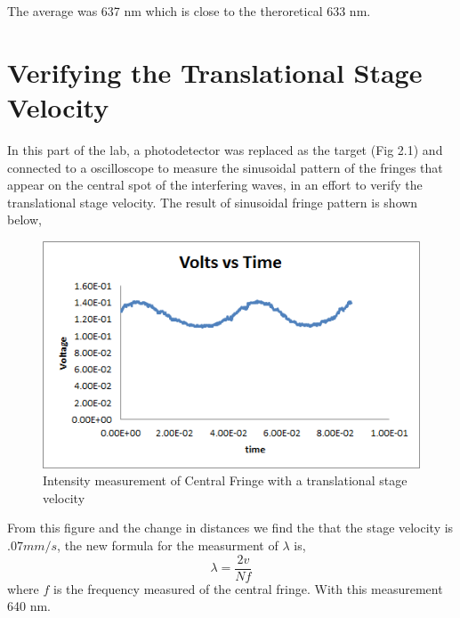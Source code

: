\documentclass[paper=a4, fontsize=11pt]{scrartcl} %
\numberwithin{equation}{section} %
\numberwithin{figure}{section} %
\numberwithin{table}{section} %
\begin{document}
The average was 637 nm which is close to the theroretical 633 nm. 

\section{Verifying the Translational Stage Velocity}
In this part of the lab, a photodetector was replaced as the target (Fig 2.1) and connected to a oscilloscope to measure the sinusoidal pattern of the  fringes that appear on the central spot of the interfering waves, in an effort to verify the translational stage velocity. The result of sinusoidal fringe pattern is shown below,
\begin{figure}[htb]
	\caption{Intensity measurement of Central Fringe with a translational stage velocity}
		\begin{center}
			\includegraphics[scale = 0.5]{unnamed}
		\end{center}
\end{figure}

From this figure and the change in distances we find the that the stage velocity is $.07 mm/s$, the new formula for the measurment of $\lambda$ is,
\begin{equation}
\lambda  = \frac{2 v}{Nf}
\end{equation}
where $f$ is the frequency measured  of the central fringe. With this measurement 640 nm. 
\end{document}
